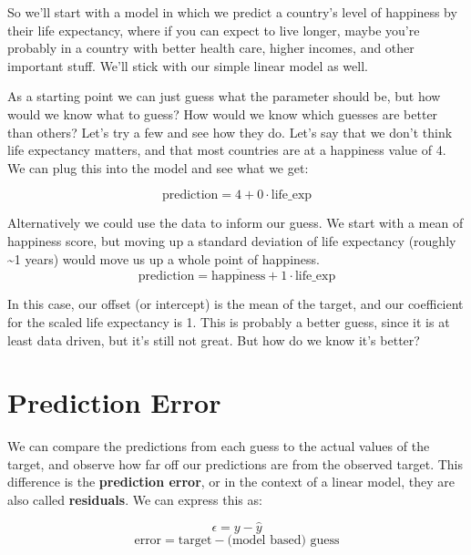 \documentclass[
  letterpaper,
]{krantz}
\begin{document}
So we'll start with a model in which we predict a country's level of
happiness by their life expectancy, where if you can expect to live
longer, maybe you're probably in a country with better health care,
higher incomes, and other important stuff. We'll stick with our simple
linear model as well.

As a starting point we can just guess what the parameter should be, but
how would we know what to guess? How would we know which guesses are
better than others? Let's try a few and see how they do. Let's say that
we don't think life expectancy matters, and that most countries are at a
happiness value of 4. We can plug this into the model and see what we
get:

\[
\textrm{prediction} = 4 + 0\cdot\textrm{life\_exp}
\]

Alternatively we could use the data to inform our guess. We start with a
mean of happiness score, but moving up a standard deviation of life
expectancy (roughly \textasciitilde1 years) would move us up a whole
point of happiness. \[
\textrm{prediction} = \overline{\textrm{happiness}} + 1\cdot\textrm{life\_exp}
\]

In this case, our offset (or intercept) is the mean of the target, and
our coefficient for the scaled life expectancy is 1. This is probably a
better guess, since it is at least data driven, but it's still not
great. But how do we know it's better?

\section{Prediction Error}\label{sec-estim-prediction-error}

We can compare the predictions from each guess to the actual values of
the target, and observe how far off our predictions are from the
observed target. This difference is the \textbf{prediction error}, or in
the context of a linear model, they are also called \textbf{residuals}.
We can express this as:

\[
\epsilon = y - \hat{y}
\] \[ 
\textrm{error} = \textrm{target} - \textrm{(model based) guess}
\]
\end{document}
